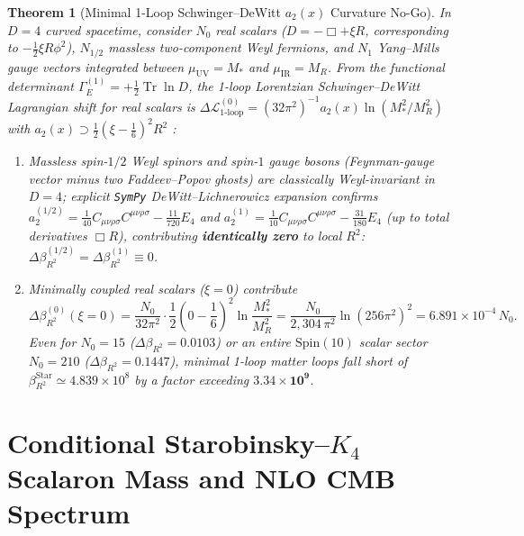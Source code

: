 \documentclass[11pt,a4paper]{article}
\newtheorem{theorem}{Theorem}[section]
\begin{document}
\begin{theorem}[Minimal 1-Loop Schwinger--DeWitt \texorpdfstring{$a_2(x)$}{a2(x)} Curvature No-Go]
\label{thm:a2-nogo}
In $D = 4$ curved spacetime, consider $N_0$ real scalars ($D = -\Box + \xi R$, corresponding to $-\frac{1}{2}\xi R\phi^2$), $N_{1/2}$ massless two-component Weyl fermions, and $N_1$ Yang--Mills gauge vectors integrated between $\mu_{\mathrm{UV}} = M_*$ and $\mu_{\mathrm{IR}} = M_R$. From the functional determinant $\Gamma_E^{(1)} = +\frac{1}{2}\operatorname{Tr}\ln D$, the 1-loop Lorentzian Schwinger--DeWitt Lagrangian shift for real scalars is $\Delta\mathcal{L}_{\mathrm{1\text{-}loop}}^{(0)} = (32\pi^2)^{-1} a_2(x)\ln(M_*^2/M_R^2)$ with $a_2(x) \supset \frac{1}{2}(\xi - \frac{1}{6})^2 R^2$ \cite{BirrellDavies1982}:
\begin{enumerate}[label=(\alph*),leftmargin=1.8em,itemsep=2pt]
\item Massless spin-$1/2$ Weyl spinors and spin-$1$ gauge bosons (Feynman-gauge vector minus two Faddeev--Popov ghosts) are classically Weyl-invariant in $D = 4$; explicit \texttt{SymPy} DeWitt--Lichnerowicz expansion confirms $a_2^{(1/2)} = \frac{1}{40}C_{\mu\nu\rho\sigma}C^{\mu\nu\rho\sigma} - \frac{11}{720}E_4$ and $a_2^{(1)} = \frac{1}{10}C_{\mu\nu\rho\sigma}C^{\mu\nu\rho\sigma} - \frac{31}{180}E_4$ (up to total derivatives $\Box R$), contributing \textbf{identically zero} to local $R^2$: $\Delta\beta_{R^2}^{(1/2)} = \Delta\beta_{R^2}^{(1)} \equiv 0$.
\item Minimally coupled real scalars ($\xi = 0$) contribute
\begin{equation}
\Delta\beta_{R^2}^{(0)}(\xi = 0) = \frac{N_0}{32\pi^2}\cdot\frac{1}{2}\left(0 - \frac{1}{6}\right)^2\ln\frac{M_*^2}{M_R^2} = \frac{N_0}{2{,}304\,\pi^2}\ln(256\pi^2)^2 = 6.891\times 10^{-4}\,N_0.
\end{equation}
Even for $N_0 = 15$ ($\Delta\beta_{R^2} = 0.0103$) or an entire $\mathrm{Spin}(10)$ scalar sector $N_0 = 210$ ($\Delta\beta_{R^2} = 0.1447$), minimal 1-loop matter loops fall short of $\beta_{R^2}^{\mathrm{Star}} \simeq 4.839\times 10^8$ by a factor exceeding $\mathbf{3.34\times 10^9}$.
\end{enumerate}
\end{theorem}

\section{Conditional Starobinsky--\texorpdfstring{$K_4$}{K4} Scalaron Mass and NLO CMB Spectrum}
\label{sec:inflation}
\end{document}
